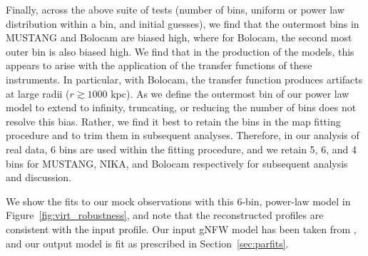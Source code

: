 \documentclass[twocolumn,traditabstract]{aa}
\begin{document}
Finally, across the above suite of tests (number of bins, uniform or power law distribution within a bin, and
initial guesses), we find that the outermost bins in MUSTANG and Bolocam are biased high, where for Bolocam,
the second most outer bin is also biased high. We find that in the production of the models, this appears to arise
with the application of the transfer functions of these instruments. In particular, with Bolocam, the transfer
function produces artifacts at large radii ($r \gtrsim 1000$ kpc). As we define the outermost bin of our power
law model to extend to infinity, truncating, or reducing the number of bins does not resolve this bias. Rather,
we find it best to retain the bins in the map fitting procedure and to trim them in subsequent analyses. Therefore,
in our analysis of real data, 6 bins are used within the fitting procedure, and we retain 5, 6, and 4 bins for
MUSTANG, NIKA, and Bolocam respectively for subsequent analysis and discussion.

We show the fits to our mock observations with this 6-bin, power-law model in Figure~\ref{fig:virt_robustness},
and note that the reconstructed profiles are consistent with the input profile. Our input gNFW model has been taken
from \citet{romero2017}, and our output model is fit as prescribed in Section~\ref{sec:parfits}.



\end{document}
